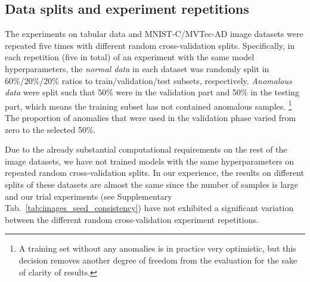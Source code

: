 \subsection{Data splits and experiment repetitions}
\label{sec:repetitions}
The experiments on tabular data and MNIST-C/MVTec-AD image datasets were repeated five times with different random cross-validation splits. Specifically, in each repetition (five in total) of an experiment with the same model hyperparameters, the \textit{normal data} in each dataset was randomly split in 60\%/20\%/20\% ratios to train/validation/test subsets, respectively. \textit{Anomalous data} were split such that 50\% were in the validation part and 50\% in the testing part, which means the training subset has not contained anomalous samples. \footnote{A training set without any anomalies is in practice very optimistic, but this decision removes another degree of freedom from the evaluation for the sake of clarity of results.} The proportion of anomalies that were used in the validation phase varied from zero to the selected 50\%. 

Due to the already substantial computational requirements on the rest of the image datasets, we have not trained models with the same hyperparameters on repeated random cross-validation splits. In our experience, the results on different splits of these datasets are almost the same since the number of samples is large and our trial experiments (see Supplementary Tab.~\ref{tab:images_seed_consistency}) have not exhibited a significant variation between the different random cross-validation experiment repetitions. 

